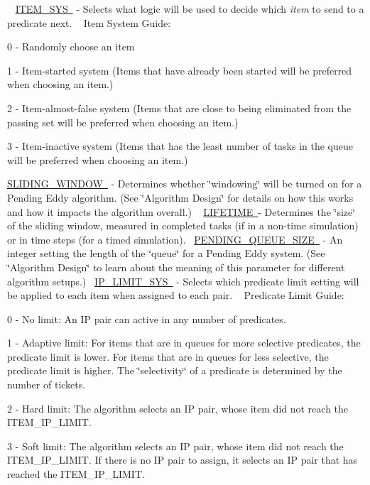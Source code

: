 ~\newline
\mbox{\hyperlink{}{I\+T\+E\+M\+\_\+\+S\+YS }} -\/ Selects what logic will be used to decide which {\itshape item} to send to a predicate next. ~\newline
Item System Guide\+:
\begin{DoxyItemize}
\item 0 -\/ Randomly choose an item
\item 1 -\/ Item-\/started system (Items that have already been started will be preferred when choosing an item.)
\item 2 -\/ Item-\/almost-\/false system (Items that are close to being eliminated from the passing set will be preferred when choosing an item.)
\item 3 -\/ Item-\/inactive system (Items that has the least number of tasks in the queue will be preferred when choosing an item.)
\end{DoxyItemize}

\mbox{\hyperlink{}{S\+L\+I\+D\+I\+N\+G\+\_\+\+W\+I\+N\+D\+OW }} -\/ Determines whether \char`\"{}windowing\char`\"{} will be turned on for a Pending Eddy algorithm. (See \char`\"{}\+Algorithm Design\char`\"{} for details on how this works and how it impacts the algorithm overall.) ~\newline
 \mbox{\hyperlink{}{L\+I\+F\+E\+T\+I\+ME }}-\/ Determines the \char`\"{}size\char`\"{} of the sliding window, measured in completed tasks (if in a non-\/time simulation) or in time steps (for a timed simulation).~\newline
\mbox{\hyperlink{}{P\+E\+N\+D\+I\+N\+G\+\_\+\+Q\+U\+E\+U\+E\+\_\+\+S\+I\+ZE }} -\/ An integer setting the length of the \char`\"{}queue\char`\"{} for a Pending Eddy system. (See \char`\"{}\+Algorithm Design\char`\"{} to learn about the meaning of this parameter for different algorithm setups.)~\newline
 \mbox{\hyperlink{}{I\+P\+\_\+\+L\+I\+M\+I\+T\+\_\+\+S\+YS }} -\/ Selects which predicate limit setting will be applied to each item when assigned to each pair. ~\newline
Predicate Limit Guide\+:
\begin{DoxyItemize}
\item 0 -\/ No limit\+: An IP pair can active in any number of predicates.
\item 1 -\/ Adaptive limit\+: For items that are in queues for more selective predicates, the predicate limit is lower. For items that are in queues for less selective, the predicate limit is higher. The \char`\"{}selectivity\char`\"{} of a predicate is determined by the number of tickets.
\item 2 -\/ Hard limit\+: The algorithm selects an IP pair, whose item did not reach the I\+T\+E\+M\+\_\+\+I\+P\+\_\+\+L\+I\+M\+IT.
\item 3 -\/ Soft limit\+: The algorithm selects an IP pair, whose item did not reach the I\+T\+E\+M\+\_\+\+I\+P\+\_\+\+L\+I\+M\+IT. If there is no IP pair to assign, it selects an IP pair that has reached the I\+T\+E\+M\+\_\+\+I\+P\+\_\+\+L\+I\+M\+IT.
\end{DoxyItemize}

